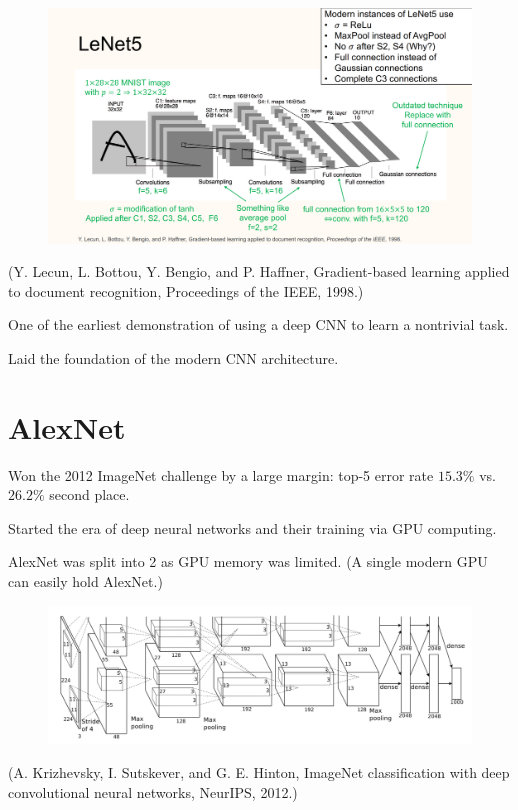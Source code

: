 \begin{definition}[7.2][LeNet5]
    \begin{figure}[H]
        \centering
        \includegraphics[width=1.0\textwidth]{.././assets/7.3.png}
    \end{figure}

    (Y. Lecun, L. Bottou, Y. Bengio, and P. Haffner, Gradient-based learning applied to document recognition, Proceedings of the IEEE, 1998.)
\end{definition}

\begin{concept}
    One of the earliest demonstration of using a deep CNN to learn a nontrivial task.

    Laid the foundation of the modern CNN architecture.
\end{concept}

\section{AlexNet}

\begin{definition}[7.4][AlexNet]
    Won the 2012 ImageNet challenge by a large margin: top-5 error rate $15.3 \%$ vs. $26.2 \%$ second place.

    Started the era of deep neural networks and their training via GPU computing.

    AlexNet was split into 2 as GPU memory was limited. (A single modern GPU can easily hold AlexNet.)

    \begin{figure}[H]
        \centering
        \includegraphics[width=1.0\textwidth]{.././assets/7.4.png}
    \end{figure}

    (A. Krizhevsky, I. Sutskever, and G. E. Hinton, ImageNet classification with deep convolutional neural networks, NeurIPS, 2012.)
\end{definition}


